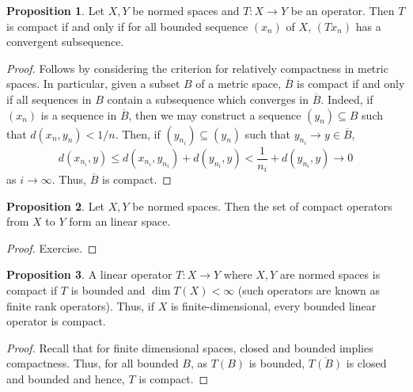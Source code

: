 \documentclass[]{article}
\theoremstyle{definition}
\theoremstyle{definition}
\newtheorem{proposition}{Proposition}[section]
\begin{document}
\begin{proposition}
  Let \(X, Y\) be normed spaces and \(T : X \to Y\) be an operator. Then 
  \(T\) is compact if and only if for all bounded sequence \((x_n)\) of 
  \(X\), \((Tx_n)\) has a convergent subsequence.
\end{proposition}
\begin{proof}
  Follows by considering the criterion for relatively compactness in metric 
  spaces. In particular, given a subset \(B\) of a metric space, 
  \(\overline{B}\) is compact if and only if all sequences in \(B\) contain a 
  subsequence which converges in \(\overline{B}\). Indeed, if \((x_n)\) is a 
  sequence in \(\overline{B}\), then we may construct a sequence \((y_n) 
  \subseteq B\) such that \(d(x_n, y_n) < 1 / n\). Then, if 
  \((y_{n_i}) \subseteq (y_n)\) such that \(y_{n_i} \to y \in \overline{B}\), 
  \[d(x_{n_i}, y) \le d(x_{n_i}, y_{n_i}) + d(y_{n_i}, y) < 
    \frac{1}{n_i} + d(y_{n_i}, y) \to 0\]
  as \(i \to \infty\). Thus, \(\overline{B}\) is compact.
\end{proof}

\begin{proposition}
  Let \(X, Y\) be normed spaces. Then the set of compact operators from \(X\) 
  to \(Y\) form an linear space.
\end{proposition}
\begin{proof}
  Exercise.
\end{proof}

\begin{proposition}
  A linear operator \(T : X \to Y\) where \(X, Y\) are normed spaces is compact 
  if \(T\) is bounded and \(\dim T(X) < \infty\) (such operators are known 
  as finite rank operators). Thus, if \(X\) is 
  finite-dimensional, every bounded linear operator is compact.
\end{proposition}
\begin{proof}
  Recall that for finite dimensional spaces, closed and bounded implies compactness. 
  Thus, for all bounded \(B\), as \(T(B)\) is bounded, \(\overline{T(B)}\) is 
  closed and bounded and hence, \(T\) is compact.
\end{proof}
\end{document}

